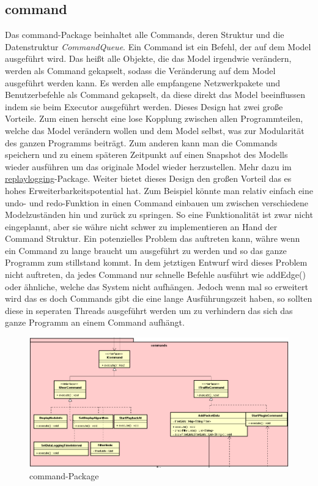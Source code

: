 \subsection{command}
\label{subsec:command}
Das command-Package beinhaltet alle Commands, deren Struktur und die Datenstruktur
\textit{CommandQueue}. Ein Command ist ein Befehl, der auf
dem Model ausgeführt wird. Das heißt alle Objekte, die das Model irgendwie verändern,
werden als Command gekapselt, sodass die Veränderung auf dem Model
ausgeführt werden kann. Es werden alle empfangene Netzwerkpakete
und Benutzerbefehle als Command gekapselt, da diese direkt das Model beeinflussen
indem sie beim Executor ausgeführt werden.
\newline
\newline
Dieses Design hat zwei große Vorteile. Zum einen herscht eine lose Kopplung zwischen
allen Programmteilen, welche das Model verändern wollen und dem Model selbst, was zur Modularität des ganzen
Programms beiträgt. Zum anderen kann man die Commands speichern und zu einem
späteren Zeitpunkt auf einen Snapshot des Modells wieder ausführen um das originale
Model wieder herzustellen. Mehr dazu im
\hyperref[subsubsec:replaylogging]{replaylogging}-Package. Weiter bietet dieses
Design den großen Vorteil das es hohes Erweiterbarkeitspotential hat. Zum Beispiel
könnte man relativ einfach eine undo- und redo-Funktion in einen Command einbauen um
zwischen verschiedene Modelzuständen hin und zurück zu springen. So eine
Funktionalität ist zwar nicht eingeplannt, aber sie währe nicht schwer zu implementieren
an Hand der Command Struktur.
\newline
\newline
Ein potenzielles Problem das auftreten kann, währe wenn ein Command zu lange braucht um
ausgeführt zu werden und so das ganze Programm zum stillstand kommt.
In dem jetztigen Entwurf wird dieses Problem nicht auftreten, da jedes Command
nur schnelle Befehle ausführt wie addEdge() oder ähnliche, welche das System nicht
aufhängen. Jedoch wenn \programname mal so erweitert wird das es doch Commands gibt
die eine lange Ausführungszeit haben, so sollten diese in seperaten Threads
ausgeführt werden um zu verhindern das sich das ganze Programm an einem Command
aufhängt.

\begin{figure}[H]
  \centering
  \includegraphics[width=\textwidth]{../diagramimages/commands.png}
  \caption{command-Package}
\end{figure}

